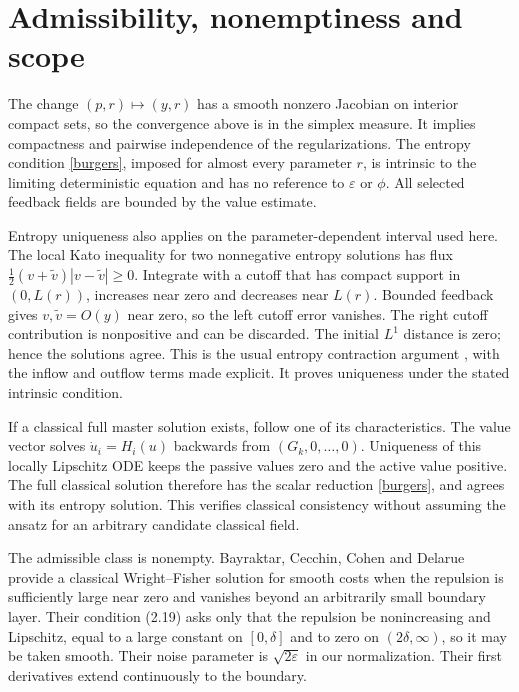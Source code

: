 \documentclass[11pt]{article}
\newcommand{\eps}{\varepsilon}
\begin{document}
\section{Admissibility, nonemptiness and scope}
The change $(p,r)\mapsto(y,r)$ has a smooth nonzero Jacobian on interior compact sets, so the convergence above is in the simplex measure. It implies compactness and pairwise independence of the regularizations. The entropy condition \eqref{burgers}, imposed for almost every parameter $r$, is intrinsic to the limiting deterministic equation and has no reference to $\eps$ or $\phi$. All selected feedback fields are bounded by the value estimate.

Entropy uniqueness also applies on the parameter-dependent interval used here. The local Kato inequality for two nonnegative entropy solutions has flux
$\tfrac12(v+\widetilde v)|v-\widetilde v|\ge0$. Integrate with a cutoff that has compact support in $(0,L(r))$, increases near zero and decreases near $L(r)$. Bounded feedback gives $v,\widetilde v=O(y)$ near zero, so the left cutoff error vanishes. The right cutoff contribution is nonpositive and can be discarded. The initial $L^1$ distance is zero; hence the solutions agree. This is the usual entropy contraction argument \cite[Theorem~1]{Kru}, with the inflow and outflow terms made explicit. It proves uniqueness under the stated intrinsic condition.

If a classical full master solution exists, follow one of its characteristics. The value vector solves $\dot u_i=H_i(u)$ backwards from $(G_k,0,\ldots,0)$. Uniqueness of this locally Lipschitz ODE keeps the passive values zero and the active value positive. The full classical solution therefore has the scalar reduction \eqref{burgers}, and agrees with its entropy solution. This verifies classical consistency without assuming the ansatz for an arbitrary candidate classical field.

The admissible class is nonempty. Bayraktar, Cecchin, Cohen and Delarue \cite[Theorem~3.4, equation~(2.19)]{BCCD} provide a classical Wright--Fisher solution for smooth costs when the repulsion is sufficiently large near zero and vanishes beyond an arbitrarily small boundary layer. Their condition (2.19) asks only that the repulsion be nonincreasing and Lipschitz, equal to a large constant on $[0,\delta]$ and to zero on $(2\delta,\infty)$, so it may be taken smooth. Their noise parameter is $\sqrt{2\eps}$ in our normalization. Their first derivatives extend continuously to the boundary.
\end{document}
